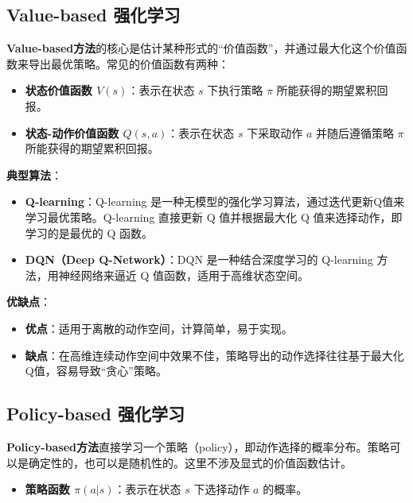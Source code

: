 \documentclass[twocolumn, 10pt]{article} %
\theoremstyle{remark}
\begin{document}
\subsection{Value-based 强化学习}

\textbf{Value-based方法}的核心是估计某种形式的“价值函数”，并通过最大化这个价值函数来导出最优策略。常见的价值函数有两种：

\begin{itemize}
    \item \textbf{状态价值函数 \( V(s) \)}：表示在状态 \( s \) 下执行策略 \( \pi \) 所能获得的期望累积回报。
    \item \textbf{状态-动作价值函数 \( Q(s, a) \)}：表示在状态 \( s \) 下采取动作 \( a \) 并随后遵循策略 \( \pi \) 所能获得的期望累积回报。
\end{itemize}

\textbf{典型算法}：

\begin{itemize}
    \item \textbf{Q-learning}：Q-learning 是一种无模型的强化学习算法，通过迭代更新Q值来学习最优策略。Q-learning 直接更新 Q 值并根据最大化 Q 值来选择动作，即学习的是最优的 Q 函数。
  
    \item \textbf{DQN（Deep Q-Network）}：DQN 是一种结合深度学习的 Q-learning 方法，用神经网络来逼近 Q 值函数，适用于高维状态空间。
\end{itemize}

\textbf{优缺点}：
\begin{itemize}
    \item \textbf{优点}：适用于离散的动作空间，计算简单，易于实现。
    \item \textbf{缺点}：在高维连续动作空间中效果不佳，策略导出的动作选择往往基于最大化Q值，容易导致“贪心”策略。
\end{itemize}

\subsection{Policy-based 强化学习}

\textbf{Policy-based方法}直接学习一个策略（policy），即动作选择的概率分布。策略可以是确定性的，也可以是随机性的。这里不涉及显式的价值函数估计。

\begin{itemize}
    \item \textbf{策略函数 \( \pi(a|s) \)}：表示在状态 \( s \) 下选择动作 \( a \) 的概率。
\end{itemize}
\end{document}
